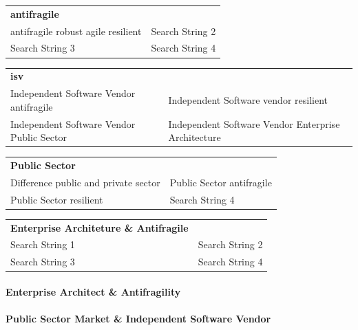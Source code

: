 \vspace{\baselineskip}

	\noindent
	\begin{tabular}{p{}p{}}
		\textbf{\Gls{antifragile}} & \\
		antifragile robust agile resilient	&	Search String 2\\%
		Search String 3	&	Search String 4\\%
	\end{tabular}

\vspace{\baselineskip}

	\noindent
	\begin{tabular}{p{}p{}}
		\textbf{\acrlong{isv}} & \\
		Independent Software Vendor antifragile	& Independent Software vendor resilient\\%
		Independent Software Vendor Public Sector	&	Independent Software Vendor Enterprise Architecture\\%
	\end{tabular}

\vspace{\baselineskip}

	\noindent
	\begin{tabular}{p{}p{}}
		\textbf{Public Sector} & \\
		Difference public and private sector &	Public Sector antifragile\\%
		Public Sector resilient	&	Search String 4\\%
	\end{tabular}

\vspace{\baselineskip}

	\noindent
	\begin{tabular}{p{}p{}}
		\textbf{Enterprise Architeture \& Antifragile} & \\
		Search String 1	&	Search String 2\\%
		Search String 3	&	Search String 4\\%
	\end{tabular}

\paragraph{Enterprise Architect \& Antifragility}


\paragraph{Public Sector Market \& Independent Software Vendor}

